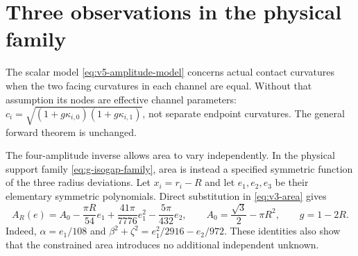 \section{Three observations in the physical family}
\label{sec:v6-three-observations}
The scalar model \eqref{eq:v5-amplitude-model} concerns actual contact
curvatures when the two facing curvatures in each channel are equal.
Without that assumption its nodes are effective channel parameters:
$c_i=\sqrt{(1+g\kappa_{i,0})(1+g\kappa_{i,1})}$, not separate
endpoint curvatures. The general forward theorem is unchanged.

The four-amplitude inverse allows area to vary independently. In the
physical support family \eqref{eq:g-isogap-family}, area is instead a
specified symmetric function of the three radius deviations. Let
$x_i=r_i-R$ and let $e_1,e_2,e_3$ be their elementary symmetric
polynomials. Direct substitution in \eqref{eq:v3-area} gives
\begin{equation}\label{eq:v6-physical-area}
 A_R(e)=A_0-\frac{\pi R}{54}e_1
             +\frac{41\pi}{7776}e_1^2-\frac{5\pi}{432}e_2,
 \qquad A_0=\frac{\sqrt3}{2}-\pi R^2,
 \qquad g=1-2R.
\end{equation}
Indeed, $\alpha=e_1/108$ and
$\beta^2+\zeta^2=e_1^2/2916-e_2/972$. These identities also show
that the constrained area introduces no additional independent unknown.

